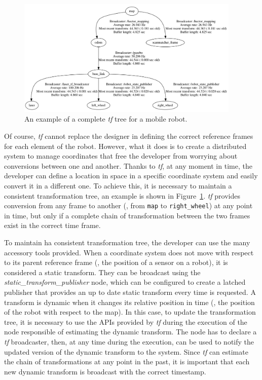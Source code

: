 \begin{figure}[t]
    \centering
    \includegraphics[width=0.95\textwidth]{gfx/ros/tf_tree}
    \caption{An example of a complete \textit{tf} tree for a mobile robot.}\label{fig:ros-tf-tree}
\end{figure}

Of course, \textit{tf} cannot replace the designer in defining the correct reference frames for each element of the robot. However, what it does is to create a distributed system to manage coordinates that free the developer from worrying about conversions between one and another. Thanks to \textit{tf}, at any moment in time, the developer can define a location in space in a specific coordinate system and easily convert it in a different one. To achieve this, it is necessary to maintain a consistent transformation tree, an example is shown in Figure~\ref{fig:ros-tf-tree}. \textit{tf} provides conversion from any frame to another (\eg, from \texttt{map} to \texttt{right\_wheel}) at any point in time, but only if a complete chain of transformation between the two frames exist in the correct time frame.

To maintain ha consistent transformation tree, the developer can use the many accessory tools provided. When a coordinate system does not move with respect to its parent reference frame (\eg, the position of a sensor on a robot), it is considered a static transform. They can be broadcast using the \textit{static\_transform\_publisher} node, which can be configured to create a latched publisher that provides an up to date static transform every time is requested. A transform is dynamic when it changes its relative position in time (\eg, the position of the robot with respect to the map). In this case, to update the transformation tree, it is necessary to use the APIs provided by \textit{tf} during the execution of the node responsible of estimating the dynamic transform. The node has to declare a \textit{tf} broadcaster, then, at any time during the execution, can be used to notify the updated version of the dynamic transform to the system.  Since \textit{tf} can estimate the chain of transformations at any point in the past, it is important that each new dynamic transform is broadcast with the correct timestamp.

